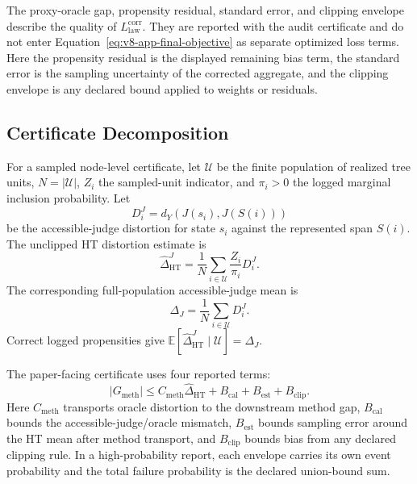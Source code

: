 The proxy-oracle gap, propensity residual, standard error, and clipping
envelope describe the quality of \(L_{\mathrm{law}}^{\mathrm{corr}}\). They are
reported with the audit certificate and do not enter
Equation~\eqref{eq:v8-app-final-objective} as separate optimized loss terms.
Here the propensity residual is the displayed remaining bias term, the standard
error is the sampling uncertainty of the corrected aggregate, and the clipping
envelope is any declared bound applied to weights or residuals.

\subsection{Certificate Decomposition}
\label{app:v8-certificate-decomposition}

For a sampled node-level certificate, let \(\mathcal U\) be the finite
population of realized tree units, \(N=|\mathcal U|\), \(Z_i\) the sampled-unit
indicator, and \(\pi_i>0\) the logged marginal inclusion probability. Let
\[
  D_i^J=d_Y(J(s_i),J(S(i)))
\]
be the accessible-judge distortion for state \(s_i\) against the represented
span \(S(i)\). The unclipped HT distortion estimate is
\[
  \widehat{\Delta}_{\mathrm{HT}}^J
  =
  \frac{1}{N}
  \sum_{i\in\mathcal U}
  \frac{Z_i}{\pi_i}D_i^J .
\]
The corresponding full-population accessible-judge mean is
\[
  \Delta_J
  =
  \frac{1}{N}\sum_{i\in\mathcal U}D_i^J .
\]
Correct logged propensities give
\(\mathbb E[\widehat{\Delta}_{\mathrm{HT}}^J\mid\mathcal U]=\Delta_J\).

The paper-facing certificate uses four reported terms:
\[
  |G_{\mathrm{meth}}|
  \le
  C_{\mathrm{meth}}\widehat{\Delta}_{\mathrm{HT}}
  +
  B_{\mathrm{cal}}
  +
  B_{\mathrm{est}}
  +
  B_{\mathrm{clip}} .
\]
Here \(C_{\mathrm{meth}}\) transports oracle distortion to the downstream
method gap, \(B_{\mathrm{cal}}\) bounds the accessible-judge/oracle mismatch,
\(B_{\mathrm{est}}\) bounds sampling error around the HT mean after method
transport, and \(B_{\mathrm{clip}}\) bounds bias from any declared clipping
rule. In a high-probability report, each envelope carries its own event
probability and the total failure probability is the declared union-bound
sum.
